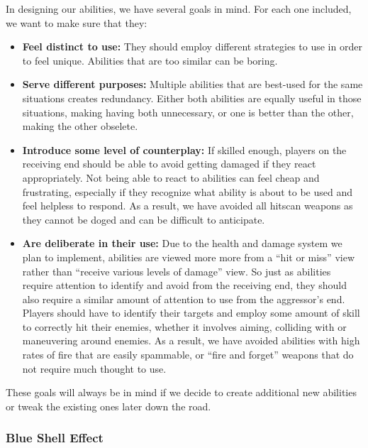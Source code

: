 \documentclass{article}
\theoremstyle{definition}
\begin{document}
In designing our abilities, we have several goals in mind. For each one
included, we want to make sure that they:
\begin{itemize}
  \item \textbf{Feel distinct to use:} They should employ different strategies
    to use in order to feel unique. Abilities that are too similar can be
    boring.
  \item \textbf{Serve different purposes:} Multiple abilities that are
    best-used for the same situations creates redundancy. Either both abilities
    are equally useful in those situations, making having both unnecessary, or
    one is better than the other, making the other obselete.
  \item \textbf{Introduce some level of counterplay:} If skilled enough,
    players on the receiving end should be able to avoid getting damaged if
    they react appropriately. Not being able to react to abilities can feel
    cheap and frustrating, especially if they recognize what ability is about
    to be used and feel helpless to respond. As a result, we have avoided all
    hitscan weapons as they cannot be doged and can be difficult to anticipate.
  \item \textbf{Are deliberate in their use:} Due to the health and damage
    system we plan to implement, abilities are viewed more more from a ``hit or
    miss'' view rather than ``receive various levels of damage'' view. So just
    as abilities require attention to identify and avoid from the receiving
    end, they should also require a similar amount of attention to use from the
    aggressor's end. Players should have to identify their targets and employ
    some amount of skill to correctly hit their enemies, whether it involves
    aiming, colliding with or maneuvering around enemies. As a result, we have
    avoided abilities with high rates of fire that are easily spammable, or
    ``fire and forget'' weapons that do not require much thought to use.
\end{itemize}

These goals will always be in mind if we decide to create additional new
abilities or tweak the existing ones later down the road.

\subsubsection{Blue Shell Effect}
\end{document}
